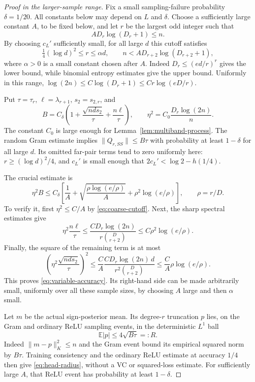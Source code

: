 \begin{proof}[Proof in the larger-sample range]
Fix a small sampling-failure probability $\delta=1/20$. All constants
below may depend on $L$ and $\delta$. Choose a sufficiently large
constant $A$, to be fixed below, and let $r$ be the largest odd integer
such that
\begin{equation}\label{eq:coarse-cutoff}
 A D_r\log(D_r+1)\le n.
\end{equation}
By choosing $c_L'$ sufficiently small, for all large $d$ this cutoff
satisfies
\[
 \tfrac14(\log d)^2\le r\le\alpha d,
 \qquad n<A D_{r+2}\log(D_{r+2}+1),
\]
where $\alpha>0$ is a small constant chosen after $A$. Indeed
$D_r\le(ed/r)^r$ gives the lower bound, while binomial entropy
estimates give the upper bound. Uniformly in this range,
$\log(2n)\le C\log(D_r+1)\le C r\log(eD/r)$.

Put $\tau=\tau_r$, $\ell=\lambda_{r+1}$, $s_2=s_{2,r}$, and
\[
 B=C_\delta\left(1+\frac{\sqrt{nd s_2}}\tau+
                            \frac{n\ell}\tau\right),\qquad
 \eta^2=C_0\frac{D_r\log(2n)}n.
\]
The constant $C_0$ is large enough for
Lemma~\ref{lem:multiband-process}. The random Gram estimate implies
$\|Q_{r,SS}\|\le B\tau$ with probability at least $1-\delta$ for
all large $d$. Its omitted far-pair terms tend to zero uniformly here:
$r\ge(\log d)^2/4$, and $c_L'$ is small enough that
$2c_L'<\log2-h(1/4)$.

The crucial estimate is
\begin{equation}\label{eq:variable-accuracy}
 \eta^2B\le C_\delta\left[
 \frac1A+\sqrt{\frac{\rho\log(e/\rho)}A}
                +\rho^2\log(e/\rho)\right],\qquad \rho=r/D.
\end{equation}
To verify it, first $\eta^2\le C/A$ by \eqref{eq:coarse-cutoff}.
Next, the sharp spectral estimates give
\[
 \eta^2\frac{n\ell}\tau
 \le\frac{C D_r\log(2n)}{r\binom D{r+2}}
 \le C\rho^2\log(e/\rho).
\]
Finally, the square of the remaining term is at most
\[
 \left(\eta^2\frac{\sqrt{nd s_2}}\tau\right)^2
 \le\frac CA\frac{C D_r\log(2n)\,d}{r^2\binom D{r+2}}
 \le\frac CA\rho\log(e/\rho).
\]
This proves \eqref{eq:variable-accuracy}. Its right-hand side can be
made arbitrarily small, uniformly over all these sample sizes, by
choosing $A$ large and then $\alpha$ small.

Let $m$ be the actual sign-posterior mean. Its degree-$r$ truncation
$p$ lies, on the Gram and ordinary ReLU sampling events, in the
deterministic $L^1$ ball
\begin{equation}\label{eq:head-radius}
 \mathbb E|p|\le4\sqrt{B\tau}=:R.
\end{equation}
Indeed $\|m-p\|_K^2\le n$ and the Gram event bound its empirical
squared norm by $B\tau$. Training consistency and the ordinary ReLU
estimate at accuracy $1/4$ then give \eqref{eq:head-radius}, without
a VC or squared-loss estimate. For sufficiently large $A$, that ReLU
event has probability at least $1-\delta$.


\end{proof}
